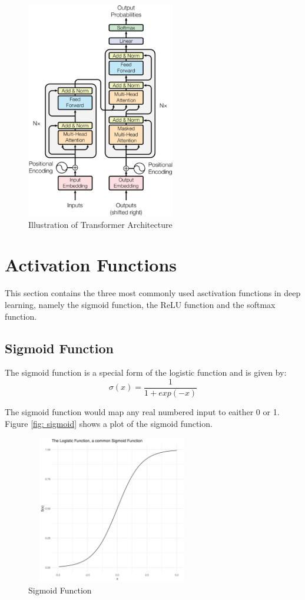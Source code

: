 \begin{figure}[ht]
\includegraphics[width=6.5cm, height=9.5cm]{images/transformer_architecture.png}
\centering
\caption{Illustration of Transformer Architecture \protect\cite{attention-is-all-you-need}}
\label{fig:transformer-architecture}
\end{figure}
\FloatBarrier

\section{Activation Functions}
This section contains the three most commonly used asctivation functions in deep learning, namely the sigmoid function, the ReLU function and the softmax function.
\subsection{Sigmoid Function}
The sigmoid function is a special form of the logistic function and is given by:
\begin{equation}
    \sigma (x) = \frac{1}{1+exp(-x)}
\end{equation}

The sigmoid function would map any real numbered input to eaither 0 or 1. Figure \ref{fig: sigmoid} shows a plot of the sigmoid function.

\begin{figure}[ht]
\includegraphics[width=7.5cm, height=6.5cm]{images/sigmoid.jpg}
\centering
\caption{Sigmoid Function}
\label{fig:sigmoid}
\end{figure}
\FloatBarrier



